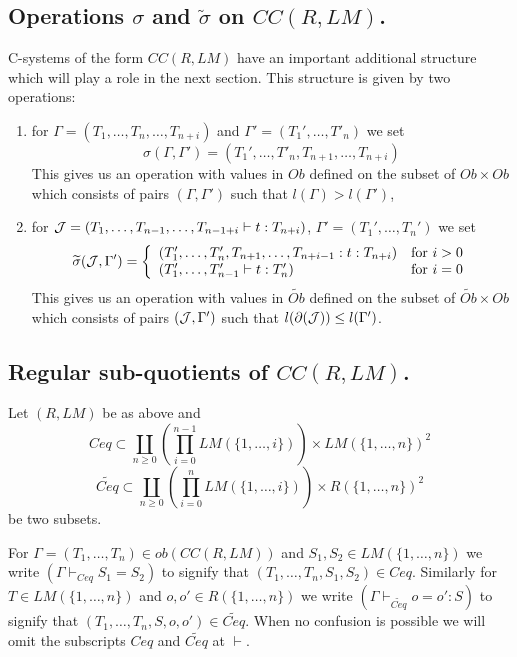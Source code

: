 \documentclass[11pt]{article}
\newcommand{\wt}{\widetilde}
\begin{document}
\subsection{Operations $\sigma$ and $\wt{\sigma}$ on $CC(R,LM)$.}
%
C-systems of the form $CC(R,LM)$ have an important additional structure which will play a role in the next section. This structure is given by two operations:
%
\begin{enumerate}
\item for $\Gamma=(T_1,\dots,T_n,\dots,T_{n+i})$ and $\Gamma'=(T_1',\dots,T'_{n})$ we set
%
$$\sigma(\Gamma,\Gamma')=(T_1',\dots,T'_n,T_{n+1},\dots,T_{n+i})$$
%
This gives us an operation with values in $Ob$ defined on the subset of $Ob\times Ob$ which consists of pairs $(\Gamma,\Gamma')$ such that $l(\Gamma)>l(\Gamma')$,
\item for ${\cal J}=(T_1,\dots,T_{n-1},\dots,T_{n-1+i}\vdash t:T_{n+i})$, $\Gamma'=(T_1',\dots,T_n')$ we set
%
$$\wt{\sigma}({\cal J},\Gamma')=
\left\{ 
\begin{array}{ll}
(T_1',\dots,T_n',T_{n+1},\dots,T_{n+i-1}:t:T_{n+i})&\mbox{\rm for $i>0$}\\
(T_1',\dots,T_{n-1}'\vdash t:T_n')&\mbox{\rm for $i=0$}
\end{array}
\right.
$$
%
This gives us an operation with values in $\wt{Ob}$ defined on the subset of $\wt{Ob}\times Ob$ which consists of pairs $({\cal J},\Gamma')$ such that $l(\partial({\cal J}))\le l(\Gamma')$.
\end{enumerate}
%




\subsection{Regular sub-quotients of $CC(R,LM)$.} 
%

Let $(R,LM)$ be as above and
%
$$Ceq\subset \coprod_{n\ge 0}  (\prod_{i=0}^{n-1} LM(\{1,\dots,i\}))\times LM(\{1,\dots,n\})^2$$
$$\wt{Ceq}\subset \coprod_{n\ge 0}  (\prod_{i=0}^{n} LM(\{1,\dots,i\}))\times R(\{1,\dots,n\})^2$$
%
be two subsets.  

For $\Gamma=(T_1,\dots,T_n)\in ob(CC(R,LM))$ and $S_1,S_2\in LM(\{1,\dots,n\})$ we write $(\Gamma\vdash_{Ceq} S_1=S_2)$ to signify that $(T_1,\dots,T_n,S_1,S_2)\in Ceq$. Similarly for $T\in LM(\{1,\dots,n\})$ and $o,o'\in R(\{1,\dots,n\})$ we write $(\Gamma\vdash_{\wt{Ceq}} o=o':S)$ to signify that $(T_1,\dots,T_n,S,o,o')\in \wt{Ceq}$.  When no confusion is possible we will omit the subscripts $Ceq$ and $\wt{Ceq}$ at $\vdash$. 
\end{document}
